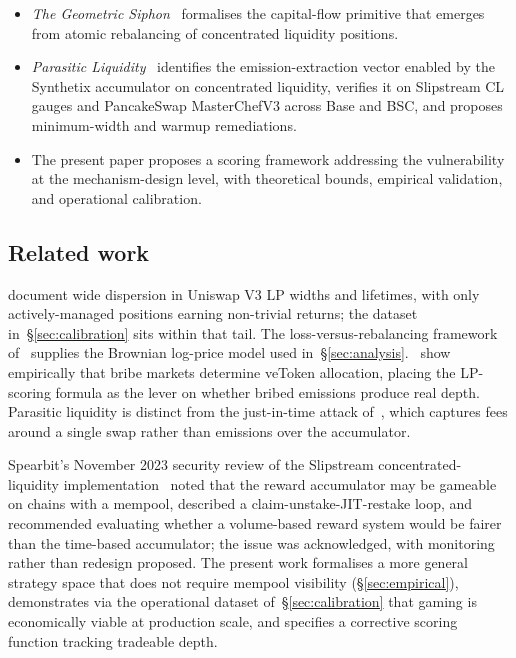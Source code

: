 \documentclass[11pt,a4paper]{article}
\theoremstyle{cgdefinition}
\theoremstyle{cgplain}
\theoremstyle{cgremark}
\begin{document}
\begin{itemize}[leftmargin=2em]
\item \emph{The Geometric Siphon}~\cite{ryan2026a,ryan2026b} formalises the capital-flow primitive that emerges from atomic rebalancing of concentrated liquidity positions.
\item \emph{Parasitic Liquidity}~\cite{ryan2026c} identifies the emission-extraction vector enabled by the Synthetix accumulator on concentrated liquidity, verifies it on Slipstream CL gauges and PancakeSwap MasterChefV3 across Base and BSC, and proposes minimum-width and warmup remediations.
\item The present paper proposes a scoring framework addressing the vulnerability at the mechanism-design level, with theoretical bounds, empirical validation, and operational calibration.
\end{itemize}

\subsection{Related work}\label{sec:relatedwork}

\cite{heimbach2022} document wide dispersion in Uniswap V3 LP widths and lifetimes, with only actively-managed positions earning non-trivial returns; the dataset in~\S\ref{sec:calibration} sits within that tail. The loss-versus-rebalancing framework of~\cite{milionis2022b} supplies the Brownian log-price model used in~\S\ref{sec:analysis}.~\cite{lloyd2023} show empirically that bribe markets determine veToken allocation, placing the LP-scoring formula as the lever on whether bribed emissions produce real depth. Parasitic liquidity is distinct from the just-in-time attack of~\cite{xiong2023}, which captures fees around a single swap rather than emissions over the accumulator.

Spearbit's November 2023 security review of the Slipstream concentrated-liquidity implementation~\cite[\S5.3.1]{spearbit2023} noted that the reward accumulator may be gameable on chains with a mempool, described a claim-unstake-JIT-restake loop, and recommended evaluating whether a volume-based reward system would be fairer than the time-based accumulator; the issue was acknowledged, with monitoring rather than redesign proposed. The present work formalises a more general strategy space that does not require mempool visibility (\S\ref{sec:empirical}), demonstrates via the operational dataset of~\S\ref{sec:calibration} that gaming is economically viable at production scale, and specifies a corrective scoring function tracking tradeable depth.
\end{document}
